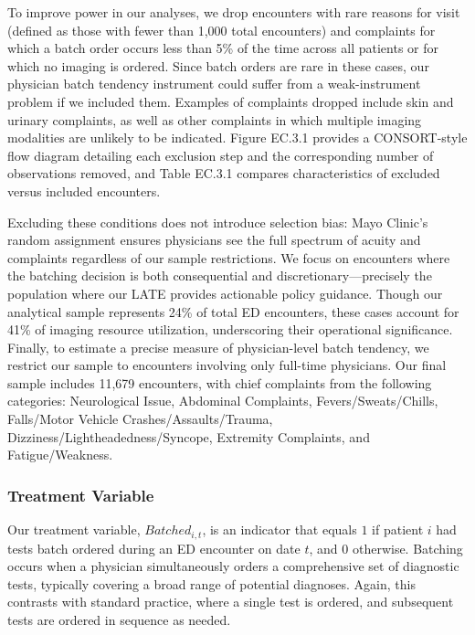 \documentclass[,,blindrev]{informs}
\begin{document}
To improve power in our analyses, we drop encounters with rare reasons
for visit (defined as those with fewer than 1,000 total encounters) and
complaints for which a batch order occurs less than 5\% of the time
across all patients or for which no imaging is ordered. Since batch
orders are rare in these cases, our physician batch tendency instrument
could suffer from a weak-instrument problem if we included them.
Examples of complaints dropped include skin and urinary complaints, as
well as other complaints in which multiple imaging modalities are
unlikely to be indicated. Figure EC.3.1 provides a CONSORT-style flow
diagram detailing each exclusion step and the corresponding number of
observations removed, and Table EC.3.1 compares characteristics of
excluded versus included encounters.

Excluding these conditions does not introduce selection bias: Mayo
Clinic's random assignment ensures physicians see the full spectrum of
acuity and complaints regardless of our sample restrictions. We focus on
encounters where the batching decision is both consequential and
discretionary---precisely the population where our LATE provides
actionable policy guidance. Though our analytical sample represents 24\%
of total ED encounters, these cases account for 41\% of imaging resource
utilization, underscoring their operational significance. Finally, to
estimate a precise measure of physician-level batch tendency, we
restrict our sample to encounters involving only full-time physicians.
Our final sample includes 11,679 encounters, with chief complaints from
the following categories: Neurological Issue, Abdominal Complaints,
Fevers/Sweats/Chills, Falls/Motor Vehicle Crashes/Assaults/Trauma,
Dizziness/Lightheadedness/Syncope, Extremity Complaints, and
Fatigue/Weakness.

\subsubsection{Treatment Variable}\label{sec:treatvar}

Our treatment variable, \(Batched_{i,t}\), is an indicator that equals
\(1\) if patient \(i\) had tests batch ordered during an ED encounter on
date \(t\), and \(0\) otherwise. Batching occurs when a physician
simultaneously orders a comprehensive set of diagnostic tests, typically
covering a broad range of potential diagnoses. Again, this contrasts
with standard practice, where a single test is ordered, and subsequent
tests are ordered in sequence as needed.
\end{document}
